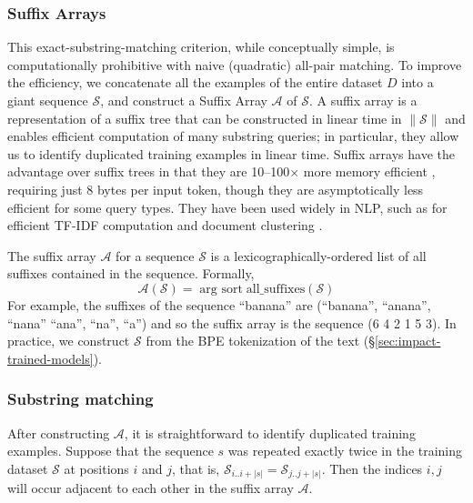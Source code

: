 \subsubsection{Suffix Arrays}
This exact-substring-matching criterion, while conceptually simple, is computationally prohibitive with naive (quadratic) all-pair matching.
%
To improve the efficiency, we concatenate all the examples of the entire dataset $D$ into a giant sequence $\mathcal{S}$, and construct a Suffix Array $\mathcal{A}$ of $\mathcal{S}$.
A suffix array \citep{manber1993suffix} is a representation of a suffix tree \citep{weiner1973linear} that can be constructed in linear time in $\lVert \mathcal{S} \rVert$ \citep{karkkainen2003simple}  
and enables efficient computation of many substring queries; in particular, they allow us to identify duplicated training examples in linear time.
Suffix arrays have the advantage over suffix trees in that they are 10--100$\times$
more memory efficient \cite{manber1993suffix}, requiring just 8 bytes per input token, though they are asymptotically less
efficient for some query types.
They have been used widely in NLP, such as for efficient TF-IDF computation \citep{yamamoto2001using} and document clustering \citep{hung2007new}.


The suffix array $\mathcal{A}$ for a sequence $\mathcal{S}$ is a lexicographically-ordered list of all suffixes contained in the sequence. 
%
Formally,
\[ \mathcal{A}(\mathcal{S}) = \mathop{\text{arg sort}} \text{all\_suffixes}(\mathcal{S}) \]
%
For example, the suffixes of the sequence ``banana'' are (``banana'',  ``anana'', ``nana'' ``ana'', ``na'', ``a'')
and so the suffix array is the sequence (6 4 2 1 5 3).
In practice, we construct $\mathcal{S}$ from the BPE tokenization of the text (\S\ref{sec:impact-trained-models}).




\subsubsection{Substring matching}

After constructing $\mathcal{A}$, it is straightforward to identify duplicated training examples.
Suppose that the sequence $s$ was repeated exactly twice in the training dataset $\mathcal{S}$ at positions $i$ and $j$,
that is, $\mathcal{S}_{i..i+|s|} = \mathcal{S}_{j..j+|s|}$.
%
Then the indices $i, j$ will occur adjacent to each other in the suffix array $\mathcal{A}$.

